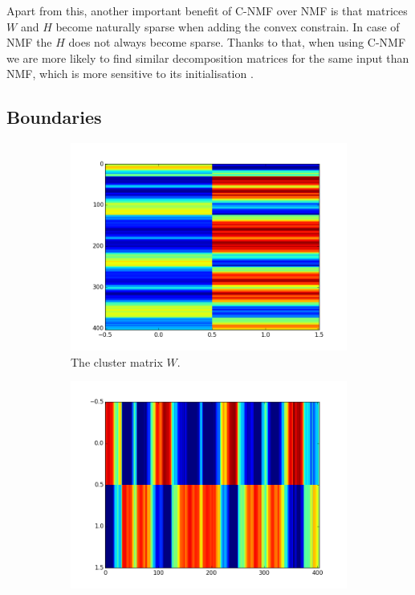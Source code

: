 Apart from this, another important benefit of C-NMF over NMF is that matrices $W$ and $H$ become naturally sparse when adding the convex constrain. In case of NMF the $H$ does not always become sparse. Thanks to that, when using C-NMF we are more likely to find similar decomposition matrices for the same input than NMF, which is more sensitive to its initialisation \cite{Nieto}. 

\vspace{10pt}


\subsection{Boundaries}

\begin{figure}
        \centering
        \begin{subfigure}[b]{0.47\textwidth}
                \includegraphics[width=\textwidth]{Figures/F}
                \caption{The cluster matrix $W$.}
                \label{fig:Wmatrix}
        \end{subfigure}%
        \begin{subfigure}[b]{0.47\textwidth}
                \includegraphics[width=\textwidth]{Figures/G}

\end{subfigure}
\end{figure}
